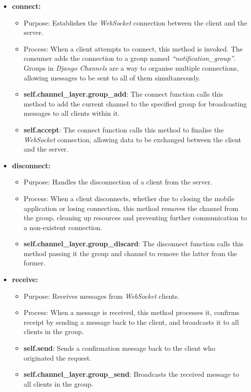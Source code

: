 \begin{itemize}
    \item \textbf{connect:}
    \begin{itemize}
        \item Purpose: Establishes the \textit{WebSocket} connection between the client and the server.
        \item Process: When a client attempts to connect, this method is invoked. The consumer adds the connection to a group named \textit{``notification\_group''}. Groups in \textit{Django Channels} are a way to organise multiple connections, allowing messages to be sent to all of them simultaneously.
        \item \textbf{self.channel\_layer.group\_add}: The connect function calls this method to add the current channel to the specified group for broadcasting messages to all clients within it.
        \item \textbf{self.accept}: The connect function calls this method to finalise the \textit{WebSocket} connection, allowing data to be exchanged between the client and the server.
    \end{itemize}

    \item \textbf{disconnect:}
    \begin{itemize}
        \item Purpose: Handles the disconnection of a client from the server.
        \item Process: When a client disconnects, whether due to closing the mobile application or losing connection, this method removes the channel from the group, cleaning up resources and preventing further communication to a non-existent connection.
        \item \textbf{self.channel\_layer.group\_discard}: The disconnect function calls this method passing it the group and channel to remove the latter from the former.
    \end{itemize}

    \item \textbf{receive:}
    \begin{itemize}
        \item Purpose: Receives messages from \textit{WebSocket} clients.
        \item Process: When a message is received, this method processes it, confirms receipt by sending a message back to the client, and broadcasts it to all clients in the group.
        \item \textbf{self.send}: Sends a confirmation message back to the client who originated the request.
        \item \textbf{self.channel\_layer.group\_send}: Broadcasts the received message to all clients in the group.
    \end{itemize}


\end{itemize}
